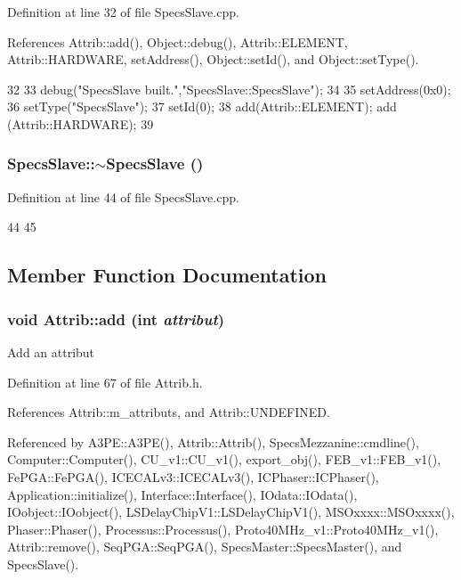Definition at line 32 of file SpecsSlave.cpp.

References Attrib::add(), Object::debug(), Attrib::ELEMENT, Attrib::HARDWARE, setAddress(), Object::setId(), and Object::setType().


\begin{DoxyCode}
32                       { 
33   debug("SpecsSlave built.","SpecsSlave::SpecsSlave");
34 
35   setAddress(0x0);
36   setType("SpecsSlave");
37   setId(0);
38   add(Attrib::ELEMENT); add (Attrib::HARDWARE);
39 }
\end{DoxyCode}
\hypertarget{classSpecsSlave_a8194c1d1a4e7a0e250e5b7dd72b0b437}{
\subsubsection[{$\sim$SpecsSlave}]{\setlength{\rightskip}{0pt plus 5cm}SpecsSlave::$\sim$SpecsSlave ()}}
\label{classSpecsSlave_a8194c1d1a4e7a0e250e5b7dd72b0b437}


Definition at line 44 of file SpecsSlave.cpp.


\begin{DoxyCode}
44                        {  
45 }
\end{DoxyCode}


\subsection{Member Function Documentation}
\hypertarget{classAttrib_a235f773af19c900264a190b00a3b4ad7}{
\subsubsection[{add}]{\setlength{\rightskip}{0pt plus 5cm}void Attrib::add (int {\em attribut})}}
\label{classAttrib_a235f773af19c900264a190b00a3b4ad7}
Add an attribut 

Definition at line 67 of file Attrib.h.

References Attrib::m\_\-attributs, and Attrib::UNDEFINED.

Referenced by A3PE::A3PE(), Attrib::Attrib(), SpecsMezzanine::cmdline(), Computer::Computer(), CU\_\-v1::CU\_\-v1(), export\_\-obj(), FEB\_\-v1::FEB\_\-v1(), FePGA::FePGA(), ICECALv3::ICECALv3(), ICPhaser::ICPhaser(), Application::initialize(), Interface::Interface(), IOdata::IOdata(), IOobject::IOobject(), LSDelayChipV1::LSDelayChipV1(), MSOxxxx::MSOxxxx(), Phaser::Phaser(), Processus::Processus(), Proto40MHz\_\-v1::Proto40MHz\_\-v1(), Attrib::remove(), SeqPGA::SeqPGA(), SpecsMaster::SpecsMaster(), and SpecsSlave().


